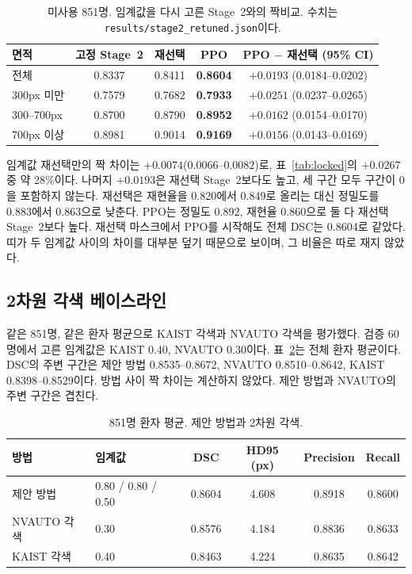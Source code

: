 \documentclass[runningheads]{llncs}
\begin{document}
\begin{table}[t]
\caption{미사용 851명. 임계값을 다시 고른 Stage~2와의 짝비교. 수치는 \texttt{results/stage2\_retuned.json}이다.}
\label{tab:retune}
\centering
\small
\begin{tabular}{lcccc}
\toprule
면적 & 고정 Stage~2 & 재선택 & PPO & PPO $-$ 재선택 (95\% CI) \\
\midrule
전체 & 0.8337 & 0.8411 & \textbf{0.8604} & $+0.0193$ (0.0184--0.0202) \\
300px 미만 & 0.7579 & 0.7682 & \textbf{0.7933} & $+0.0251$ (0.0237--0.0265) \\
300--700px & 0.8700 & 0.8790 & \textbf{0.8952} & $+0.0162$ (0.0154--0.0170) \\
700px 이상 & 0.8981 & 0.9014 & \textbf{0.9169} & $+0.0156$ (0.0143--0.0169) \\
\bottomrule
\end{tabular}
\end{table}

임계값 재선택만의 짝 차이는 $+0.0074$($0.0066$--$0.0082$)로, 표~\ref{tab:locked}의 $+0.0267$ 중 약 28\%이다. 나머지 $+0.0193$은 재선택 Stage~2보다도 높고, 세 구간 모두 구간이 0을 포함하지 않는다. 재선택은 재현율을 0.820에서 0.849로 올리는 대신 정밀도를 0.883에서 0.863으로 낮춘다. PPO는 정밀도 0.892, 재현율 0.860으로 둘 다 재선택 Stage~2보다 높다. 재선택 마스크에서 PPO를 시작해도 전체 DSC는 0.8604로 같았다. 띠가 두 임계값 사이의 차이를 대부분 덮기 때문으로 보이며, 그 비율은 따로 재지 않았다.

\subsection{2차원 각색 베이스라인}
같은 851명, 같은 환자 평균으로 KAIST 각색과 NVAUTO 각색을 평가했다. 검증 60명에서 고른 임계값은 KAIST 0.40, NVAUTO 0.30이다. 표~\ref{tab:baselines}는 전체 환자 평균이다. DSC의 주변 구간은 제안 방법 0.8535--0.8672, NVAUTO 0.8510--0.8642, KAIST 0.8398--0.8529이다. 방법 사이 짝 차이는 계산하지 않았다. 제안 방법과 NVAUTO의 주변 구간은 겹친다.

\begin{table}[t]
\caption{851명 환자 평균. 제안 방법과 2차원 각색.}
\label{tab:baselines}
\centering
\begin{tabular}{llcccc}
\toprule
방법 & 임계값 & DSC & HD95 (px) & Precision & Recall \\
\midrule
제안 방법 & 0.80 / 0.80 / 0.50 & 0.8604 & 4.608 & 0.8918 & 0.8600 \\
NVAUTO 각색 & 0.30 & 0.8576 & 4.184 & 0.8836 & 0.8633 \\
KAIST 각색 & 0.40 & 0.8463 & 4.224 & 0.8635 & 0.8642 \\
\bottomrule
\end{tabular}
\end{table}
\end{document}
